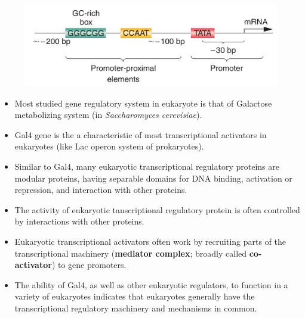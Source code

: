 \documentclass[11pt,dvipsnames,ignorenonframetext,aspectratio=169]{beamer}
\providecommand{\tightlist}{%
  \setlength{\itemsep}{0pt}\setlength{\parskip}{0pt}}
\begin{document}
\begin{frame}{}
\protect\hypertarget{section-16}{}
\begin{figure}
\includegraphics[width=0.65\linewidth]{../images/promoter_promoter_proximal_elements} \end{figure}
\end{frame}

\begin{frame}{}
\protect\hypertarget{section-17}{}
\begin{itemize}
\tightlist
\item
  Most studied gene regulatory system in eukaryote is that of Galactose
  metabolizing system (in \emph{Saccharomyces cerevisiae}).
\item
  Gal4 gene is the a characteristic of most transcriptional activators
  in eukaryotes (like Lac operon system of prokaryotes).
\item
  Similar to Gal4, many eukaryotic transcriptional regulatory proteins
  are modular proteins, having separable domains for DNA binding,
  activation or repression, and interaction with other proteins.
\item
  The activity of eukaryotic tanscriptional regulatory protein is often
  controlled by interactions with other proteins.
\item
  Eukaryotic transcriptional activators often work by recruiting parts
  of the transcriptional machinery (\textbf{mediator complex}; broadly
  called \textbf{co-activator}) to gene promoters.
\item
  The ability of Gal4, as well as other eukaryotic regulators, to
  function in a variety of eukaryotes indicates that eukaryotes
  generally have the transcriptional regulatory machinery and mechanisms
  in common.
\end{itemize}
\end{frame}
\end{document}
